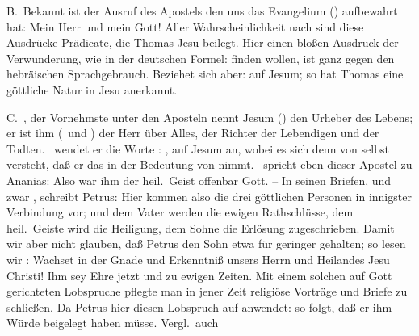 \vabst B.~Bekannt ist der Ausruf des Apostels  den uns das Evangelium () aufbewahrt hat: Mein Herr und mein Gott! Aller Wahrscheinlichkeit nach sind diese Ausdrücke Prädicate, die Thomas Jesu beilegt. Hier einen bloßen Ausdruck der Verwunderung, wie in der deutschen Formel:  finden wollen, ist ganz gegen den hebräischen Sprachgebrauch. Beziehet sich aber:  auf Jesum; so hat Thomas eine göttliche Natur in Jesu anerkannt.\par

\vabst C.~, der Vornehmste unter den Aposteln nennt Jesum () den Urheber des Lebens; er ist ihm (\ und ) der Herr über Alles, der Richter der Lebendigen und der Todten. \ wendet er die Worte : , auf Jesum an, wobei es sich denn von selbst versteht, daß er das  in der Bedeutung von  nimmt. \ spricht eben dieser Apostel zu Ananias:  Also war ihm der heil.\ Geist offenbar Gott. -- In seinen Briefen, und zwar , schreibt Petrus:  Hier kommen also die drei göttlichen Personen in innigster Verbindung vor; und dem Vater werden die ewigen Rathschlüsse, dem heil.\ Geiste wird die Heiligung, dem Sohne die Erlösung zugeschrieben. Damit wir aber nicht glauben, daß Petrus den Sohn etwa für geringer gehalten; so lesen wir : Wachset in der Gnade und Erkenntniß unsers Herrn und Heilandes Jesu Christi! Ihm sey Ehre jetzt und zu ewigen Zeiten. Mit einem solchen auf Gott gerichteten Lobspruche pflegte man in jener Zeit religiöse Vorträge und Briefe zu schließen. Da Petrus hier diesen Lobspruch auf  anwendet: so folgt, daß er ihm  Würde beigelegt haben müsse. Vergl.\ auch \par

